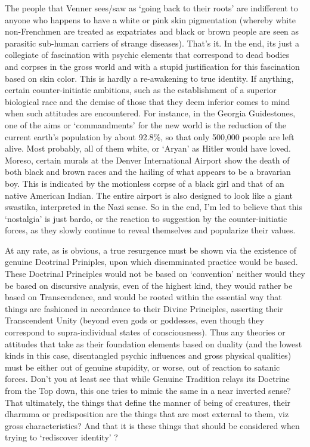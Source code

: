 \begin{footnotesize}
\begin{sffamily}
The people that Venner sees/saw as `going back to their roots' are indifferent to anyone who happens to have a white or pink skin pigmentation (whereby white non-Frenchmen are treated as expatriates and black or brown people are seen as parasitic sub-human carriers of strange diseases). That's it. In the end, its just a collegiate of fascination with psychic elements that correspond to dead bodies and corpses in the gross world and with a stupid justification for this fascination based on skin color. This is hardly a re-awakening to true identity. If anything, certain counter-initiatic ambitions, such as the establishment of a superior biological race and the demise of those that they deem inferior comes to mind when such attitudes are encountered. For instance, in the Georgia Guidestones, one of the aims or `commandments' for the new world is the reduction of the current earth's population by about 92.8\%, so that only 500,000 people are left alive. Most probably, all of them white, or `Aryan' as Hitler would have loved. Moreso, certain murals at the Denver International Airport show the death of both black and brown races and the hailing of what appears to be a bravarian boy. This is indicated by the motionless corpse of a black girl and that of an native American Indian. The entire airport is also designed to look like a giant swastika, interpreted in the Nazi sense. So in the end, I'm led to believe that this `nostalgia' is just bardo, or the reaction to suggestion by the counter-initiatic forces, as they slowly continue to reveal themselves and popularize their values.

At any rate, as is obvious, a true resurgence must be shown via the existence of genuine Dcotrinal Priniples, upon which disemminated practice would be based. These Doctrinal Principles would not be based on `convention' neither would they be based on discursive analysis, even of the highest kind, they would rather be based on Transcendence, and would be rooted within the essential way that things are fashioned in accordance to their Divine Principles, asserting their Transcendent Unity (beyond even gods or goddesses, even though they correspond to supra-individual states of consciousness). Thus any theories or attitudes that take as their foundation elements based on duality (and the lowest kinds in this case, disentangled psychic influences and gross physical qualities) must be either out of genuine stupidity, or worse, out of reaction to satanic forces. Don't you at least see that while Genuine Tradition relays its Doctrine from the Top down, this one tries to mimic the same in a near inverted sense? That ultimately, the things that define the manner of being of creatures, their dharmma or predisposition are the things that are most external to them, viz gross characteristics? And that it is these things that should be considered when trying to `rediscover identity' ?


\end{sffamily}
\end{footnotesize}
